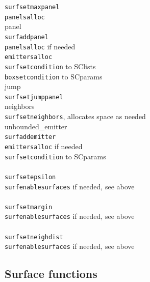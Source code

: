 \documentclass {scrbook}
\newcommand {\ttt} {\texttt}
\begin{document}
\begin{tabbing}
\>\>\ttt{surfsetmaxpanel}\\
\>\>\>\ttt{panelsalloc}\\
\>panel\\
\>\>\ttt{surfaddpanel}\\
\>\>\>\ttt{panelsalloc} if needed\\
\>\>\>\>\ttt{emittersalloc}\\
\>\>\>\ttt{surfsetcondition} to SClists\\
\>\>\>\ttt{boxsetcondition} to SCparams\\
\>jump\\
\>\>\ttt{surfsetjumppanel}\\
\>neighbors\\
\>\>\ttt{surfsetneighbors}, allocates space as needed\\
\>unbounded\_emitter\\
\>\>\ttt{surfaddemitter}\\
\>\>\>\ttt{emittersalloc} if needed\\
\>\>\>\ttt{surfsetcondition} to SCparams\\
\newline \\
\ttt{surfsetepsilon}\\
\>\ttt{surfenablesurfaces} if needed, see above\\
\newline \\
\ttt{surfsetmargin}\\
\>\ttt{surfenablesurfaces} if needed, see above\\
\newline \\
\ttt{surfsetneighdist}\\
\>\ttt{surfenablesurfaces} if needed, see above\\
\end{tabbing}


\subsection{Surface functions}
\end{document}
